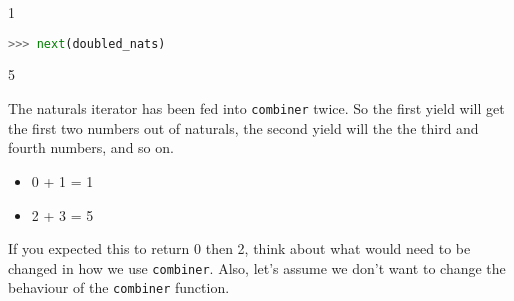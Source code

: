 \begin{solution}[0.25in]
1
\end{solution}
\begin{lstlisting}[language=Python]
>>> next(doubled_nats)
\end{lstlisting}
\begin{solution}[0.25in]
5
\end{solution}
\begin{solution}
The naturals iterator has been fed into \texttt{combiner} twice. So the
first yield will get the first two numbers out of naturals, the second yield
will the the third and fourth numbers, and so on.
\begin{itemize}
    \item 0 + 1 = 1
    \item 2 + 3 = 5
\end{itemize}
If you expected this to return 0 then 2, think about what would need to
be changed in how we use \texttt{combiner}. Also, let's assume we don't want to
change the behaviour of the \texttt{combiner} function.
\end{solution}



